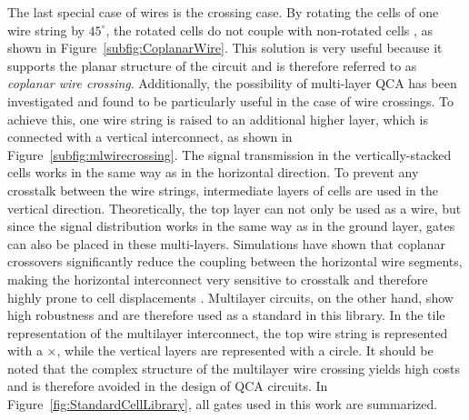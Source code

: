 The last special case of wires is the crossing case. By rotating the cells of one wire string by $45^{\circ}$, the rotated cells do not couple with non-rotated cells \cite{Inverter_displacements}, as shown in Figure~\ref{subfig:CoplanarWire}. This solution is very useful because it supports the planar structure of the circuit and is therefore referred to as \textit{coplanar wire crossing}. Additionally, the possibility of multi-layer QCA has been investigated \cite{multi_lyer_wire_crossing} and found to be particularly useful in the case of wire crossings. To achieve this, one wire string is raised to an additional higher layer, which is connected with a vertical interconnect, as shown in Figure~\ref{subfig:mlwirecrossing}. The signal transmission in the vertically-stacked cells works in the same way as in the horizontal direction. To prevent any crosstalk between the wire strings, intermediate layers of cells are used in the vertical direction. Theoretically, the top layer can not only be used as a wire, but since the signal distribution works in the same way as in the ground layer, gates can also be placed in these multi-layers. Simulations have shown that coplanar crossovers significantly reduce the coupling between the horizontal wire segments, making the horizontal interconnect very sensitive to crosstalk and therefore highly prone to cell displacements \cite{Inverter_displacements}. Multilayer circuits, on the other hand, show high robustness and are therefore used as a standard in this library. In the tile representation of the multilayer interconnect, the top wire string is represented with a $\times$, while the vertical layers are represented with a circle. It should be noted that the complex structure of the multilayer wire crossing yields high costs and is therefore avoided in the design of QCA circuits. In Figure~\ref{fig:StandardCellLibrary}, all gates used in this work are summarized.

